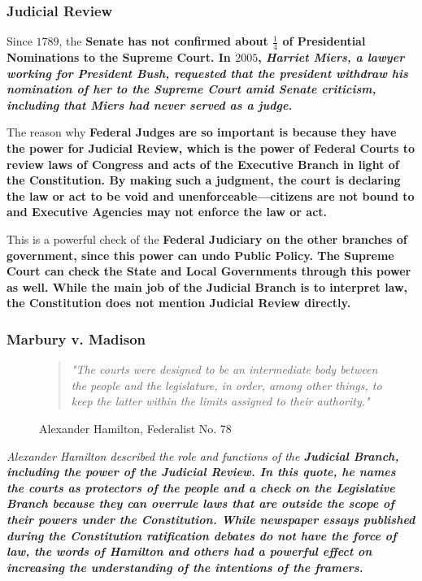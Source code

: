 
\subsubsection*{Judicial Review}

Since $1789$, the \bf{Senate} has not confirmed about $\frac{1}{4}$ of \bf{Presidential Nominations} to the \bf{Supreme Court}.
In $2005$, \it{Harriet Miers}, a lawyer working for \it{President Bush}, requested that the \bf{president} withdraw his nomination of her to the
\bf{Supreme Court} amid \bf{Senate} criticism, including that \it{Miers} had never served as a judge.

\begin{definition}
    The reason why \bf{Federal Judges} are so important is because they have the power for \bf{Judicial Review}, which is the power
    of \bf{Federal Courts} to review laws of \bf{Congress} and acts of the \bf{Executive Branch} in light of the \bf{Constitution}.
    By making such a judgment, the court is declaring the law or act to be void and unenforceable—citizens are not bound to and
    \bf{Executive Agencies} may not enforce the law or act.
    
    This is a powerful check of the \bf{Federal Judiciary} on the other branches of government, since this power
    can undo \bf{Public Policy}. The \bf{Supreme Court} can check the \bf{State} and \bf{Local Governments}
    through this power as well. While the main job of the \bf{Judicial Branch} is to interpret law, the \bf{Constitution}
    does not mention \bf{Judicial Review} directly.
\end{definition}

\subsubsection*{Marbury v. Madison}

\begin{figure}[h]
    \begin{quote}
        \it{"The courts were designed to be an intermediate body between the people and the legislature,
            in order, among other things, to keep the latter within the limits assigned to their authority."}
    \end{quote}
    \caption{Alexander Hamilton, Federalist No. 78}
\end{figure}

\it{Alexander Hamilton} described the role and functions of the \bf{Judicial Branch}, including the power of the \bf{Judicial Review}.
In this quote, he names the courts as protectors of the people and a check on the \bf{Legislative Branch} because they can overrule laws
that are outside the scope of their powers under the \bf{Constitution}. While newspaper essays published during the \bf{Constitution}
ratification debates do not have the force of law, the words of \it{Hamilton} and others had a powerful effect on increasing the understanding
of the intentions of the framers.

